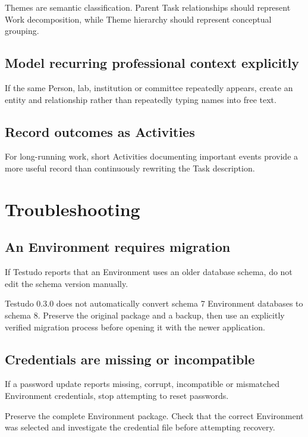 \documentclass{testudomanual}
\begin{document}
Themes are semantic classification. Parent Task relationships should represent Work decomposition, while Theme hierarchy should represent conceptual grouping.

\section{Model recurring professional context explicitly}

If the same Person, lab, institution or committee repeatedly appears, create an entity and relationship rather than repeatedly typing names into free text.

\section{Record outcomes as Activities}

For long-running work, short Activities documenting important events provide a more useful record than continuously rewriting the Task description.

\chapter{Troubleshooting}

\section{An Environment requires migration}

If Testudo reports that an Environment uses an older database schema, do not edit the schema version manually.

Testudo 0.3.0 does not automatically convert schema 7 Environment databases to schema 8. Preserve the original package and a backup, then use an explicitly verified migration process before opening it with the newer application.

\section{Credentials are missing or incompatible}

If a password update reports missing, corrupt, incompatible or mismatched Environment credentials, stop attempting to reset passwords.

Preserve the complete Environment package. Check that the correct Environment was selected and investigate the credential file before attempting recovery.
\end{document}
